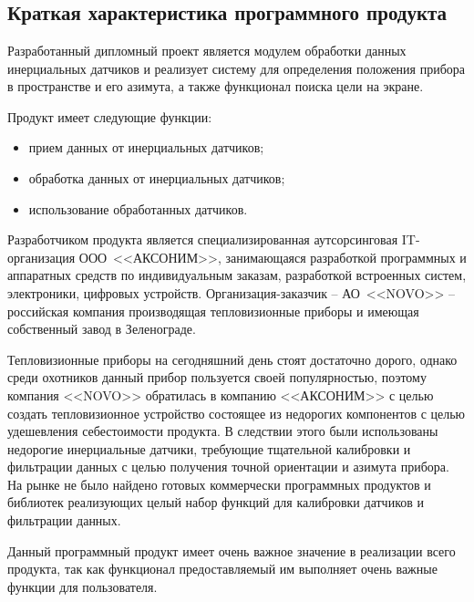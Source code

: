 \section{\texorpdfstring{\MakeUppercase \economicalPartName}{\economicalPartName}}


\subsection{Краткая характеристика программного продукта}

Разработанный дипломный проект является модулем обработки данных инерциальных датчиков
и реализует систему для определения положения прибора в пространстве и его азимута,
а также функционал поиска цели на экране.

Продукт имеет следующие функции:
\begin{itemize}
  \item прием данных от инерциальных датчиков;
  \item обработка данных от инерциальных датчиков;
  \item использование обработанных датчиков.
\end{itemize}

Разработчиком продукта является специализированная аутсорсинговая IT-организация
ООО~<<АКСОНИМ>>, занимающаяся разработкой программных и аппаратных средств
по индивидуальным заказам, разработкой встроенных систем, электроники,
цифровых устройств. Организация-заказчик -- АО~<<NOVO>> --
российская компания производящая тепловизионные приборы и имеющая собственный завод в Зеленограде.

Тепловизионные приборы на сегодняшний день стоят достаточно дорого, однако среди охотников данный прибор пользуется 
своей популярностью, поэтому компания <<NOVO>> обратилась в компанию <<АКСОНИМ>> с целью создать тепловизионное устройство
состоящее из недорогих компонентов с целью удешевления себестоимости продукта. В следствии этого были использованы недорогие
инерциальные датчики, требующие тщательной калибровки и фильтрации данных с целью получения точной ориентации и азимута прибора.
На рынке не было найдено готовых коммерчески программных продуктов и библиотек реализующих целый набор функций для калибровки датчиков
и фильтрации данных.

Данный программный продукт имеет очень важное значение в реализации всего продукта, так как функционал предоставляемый им
выполняет очень важные функции для пользователя.

